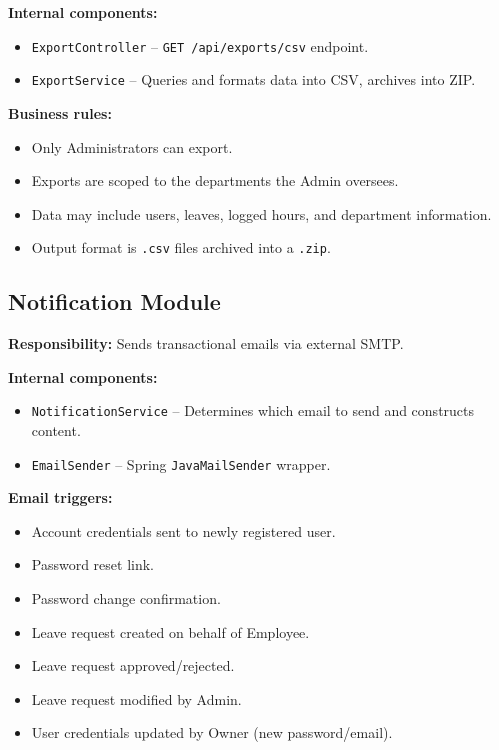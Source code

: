 \documentclass[11pt,a4paper]{article}
\begin{document}
\textbf{Internal components:}
\begin{itemize}[leftmargin=1.5em]
    \item \texttt{ExportController} -- \texttt{GET /api/exports/csv} endpoint.
    \item \texttt{ExportService} -- Queries and formats data into CSV, archives into ZIP.
\end{itemize}

\textbf{Business rules:}
\begin{itemize}[leftmargin=1.5em]
    \item Only Administrators can export.
    \item Exports are scoped to the departments the Admin oversees.
    \item Data may include users, leaves, logged hours, and department information.
    \item Output format is \texttt{.csv} files archived into a \texttt{.zip}.
\end{itemize}

\subsection{Notification Module}

\textbf{Responsibility:} Sends transactional emails via external SMTP.

\textbf{Internal components:}
\begin{itemize}[leftmargin=1.5em]
    \item \texttt{NotificationService} -- Determines which email to send and constructs content.
    \item \texttt{EmailSender} -- Spring \texttt{JavaMailSender} wrapper.
\end{itemize}

\textbf{Email triggers:}
\begin{itemize}[leftmargin=1.5em]
    \item Account credentials sent to newly registered user.
    \item Password reset link.
    \item Password change confirmation.
    \item Leave request created on behalf of Employee.
    \item Leave request approved/rejected.
    \item Leave request modified by Admin.
    \item User credentials updated by Owner (new password/email).
\end{itemize}
\end{document}
